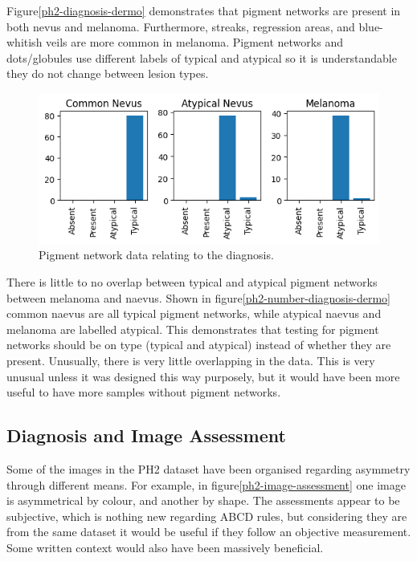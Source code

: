 Figure\ref{ph2-diagnosis-dermo} demonstrates that pigment networks are present in both nevus and melanoma. Furthermore, streaks, regression areas, and blue-whitish veils are more common in melanoma. Pigment networks and dots/globules use different labels of typical and atypical so it is understandable they do not change between lesion types.

\begin{figure}
	\centering
	\includegraphics[scale=0.75]{images/ph2/ph2-pigment-diagnosis.png}
	\caption{Pigment network data relating to the diagnosis.}
\end{figure}\label{ph2-number-diagnosis-dermo}

There is little to no overlap between typical and atypical pigment networks between melanoma and naevus. Shown in figure\ref{ph2-number-diagnosis-dermo} common naevus are all typical pigment networks, while atypical naevus and melanoma are labelled atypical. This demonstrates that testing for pigment networks should be on type (typical and atypical) instead of whether they are present. Unusually, there is very little overlapping in the data. This is very unusual unless it was designed this way purposely, but it would have been more useful to have more samples without pigment networks.

\subsection{Diagnosis and Image Assessment}

Some of the images in the PH2 dataset have been organised regarding asymmetry through different means. For example, in figure\ref{ph2-image-assessment} one image is asymmetrical by colour, and another by shape. The assessments appear to be subjective, which is nothing new regarding ABCD rules, but considering they are from the same dataset it would be useful if they follow an objective measurement. Some written context would also have been massively beneficial.

